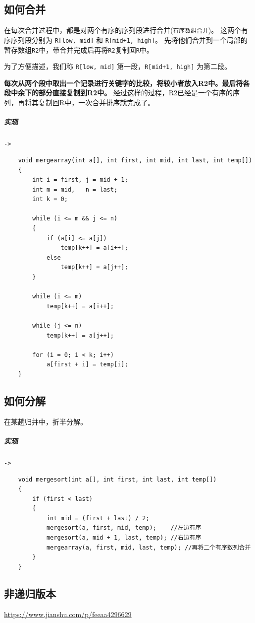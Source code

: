 \documentclass[UTF8,a4paper,12pt]{ctexbook}
\begin{document}
	\subsection{如何合并}
		在每次合并过程中，都是对两个有序的序列段进行合并(\verb|有序数组合并|)。	这两个有序序列段分别为 \verb|R[low, mid]| 和 \verb|R[mid+1, high]|。
		先将他们合并到一个局部的暂存数组\verb|R2|中，带合并完成后再将\verb|R2|复制回\verb|R|中。
	
		为了方便描述，我们称 \verb|R[low, mid]| 第一段，\verb|R[mid+1, high]| 为第二段。
		
		\textbf{每次从两个段中取出一个记录进行关键字的比较，将较小者放入R2中。最后将各段中余下的部分直接复制到R2中。}
		经过这样的过程，R2已经是一个有序的序列，再将其复制回R中，一次合并排序就完成了。
		
		\subparagraph{实现}\verb|->|
			\begin{lstlisting}
	void mergearray(int a[], int first, int mid, int last, int temp[])  
	{  
		int i = first, j = mid + 1;  
		int m = mid,   n = last;  
		int k = 0;  
		
		while (i <= m && j <= n)  
		{  
			if (a[i] <= a[j])  
				temp[k++] = a[i++];  
			else  
				temp[k++] = a[j++];  
		}  
		
		while (i <= m)  
			temp[k++] = a[i++];  
		
		while (j <= n)  
			temp[k++] = a[j++];  
		
		for (i = 0; i < k; i++)  
			a[first + i] = temp[i];  
	}  
			\end{lstlisting}
		
	\subsection{如何分解}
		在某趟归并中，折半分解。
	
		\subparagraph{实现}\verb|->|
		\begin{lstlisting}
	void mergesort(int a[], int first, int last, int temp[])  
	{  
		if (first < last)  
		{  
			int mid = (first + last) / 2;  
			mergesort(a, first, mid, temp);    //左边有序  
			mergesort(a, mid + 1, last, temp); //右边有序  
			mergearray(a, first, mid, last, temp); //再将二个有序数列合并  
		}  
	}  
		\end{lstlisting}
		
	
	
	\subsection{非递归版本}
		\url{https://www.jianshu.com/p/feeaa4296629}
		
\end{document}
